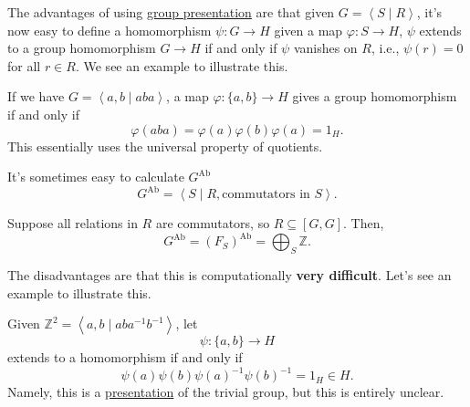 \begin{remark}
	The advantages of using \hyperref[def:group-presentation]{group presentation} are that given \(G = \left< S \mid R \right> \), it's now easy to define
	a homomorphism \(\psi \colon G\to H\) given a map \(\varphi \colon S\to H\), \(\psi \) extends to a group homomorphism \(G\to H\) if and only if \(\psi \)
	vanishes on \(R\), i.e., \(\psi (r) = 0\) for all \(r\in R\). We see an example to illustrate this.

	\begin{eg}
		If we have \(G = \left< a, b \mid aba \right> \), a map \(\varphi \colon \{a, b\}\to H\) gives a group homomorphism if and only if
		\[
			\varphi (aba) = \varphi (a)\varphi (b)\varphi (a) = 1_H.
		\]
		This essentially uses the universal property of quotients.
	\end{eg}
\end{remark}

\begin{remark}
	It's sometimes easy to calculate \(G^{\mathrm{Ab}}\)
	\[
		G^{\mathrm{Ab}} = \left< S \mid R, \text{commutators in \(S\)}\right>.
	\]
	\begin{eg}
		Suppose all relations in \(R\) are commutators, so \(R\subseteq[G, G]\). Then,
		\[
			G^{\mathrm{Ab}} = (F_S)^{\mathrm{Ab}} = \bigoplus_S \mathbb{Z}.
		\]
	\end{eg}
\end{remark}
\begin{remark}
	The disadvantages are that this is computationally \textbf{very difficult}. Let's see an example to illustrate this.
	\begin{eg}
		Given \(\mathbb{Z} ^2 = \left< a, b \mid aba^{-1} b^{-1}  \right> \), let
		\[
			\psi \colon \{a, b\}\to H
		\]
		extends to a homomorphism if and only if
		\[
			\psi (a)\psi (b)\psi (a)^{-1} \psi (b)^{-1} = 1_H\in H.
		\]
		Namely, this is a \hyperref[def:group-presentation]{presentation} of the trivial group, but this is entirely unclear.
	\end{eg}
\end{remark}
